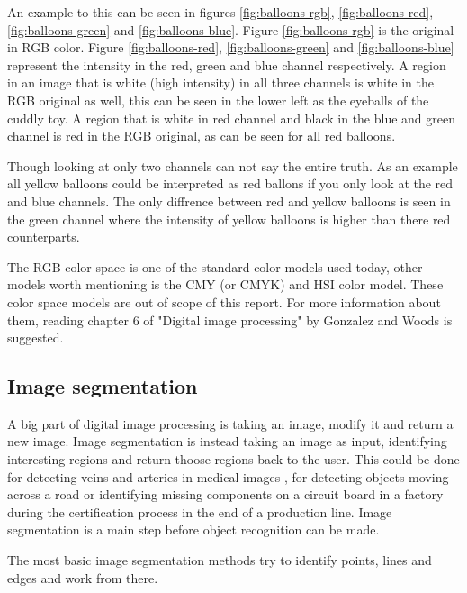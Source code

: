 An example to this can be seen in figures \ref{fig:balloons-rgb},
\ref{fig:balloons-red}, \ref{fig:balloons-green} and \ref{fig:balloons-blue}.
Figure \ref{fig:balloons-rgb} is the original in RGB color. Figure \ref{fig:balloons-red},
\ref{fig:balloons-green} and \ref{fig:balloons-blue} represent the intensity in the red,
green and blue channel respectively. A region in an image that is white (high
intensity) in all three channels is white in the RGB original as well, this can
be seen in the lower left as the eyeballs of the cuddly toy. A region that is white
in red channel and black in the blue and green channel is red in the RGB original, as
can be seen for all red balloons.

Though looking at only two channels can not say the entire truth. As an example all
yellow balloons could be interpreted as red ballons if you only look at the
red and blue channels. The only diffrence between red and yellow balloons is
seen in the green channel where the intensity of yellow balloons is higher than
there red counterparts.

The RGB color space is one of the standard color models used today, other models
worth mentioning is the CMY (or CMYK) and HSI color model. These color space
models are out of scope of this report. For more information about them,
reading chapter 6 of "Digital image processing" by Gonzalez and Woods \cite{gonzalez2008} is suggested.


\subsection{Image segmentation}
A big part of digital image processing is taking an image, modify it and
return a new image. Image segmentation is instead taking an image as input,
identifying interesting regions and return thoose regions back to the user.
This could be done for detecting veins and arteries in medical images \cite{olena2010},
for detecting objects moving across a road or identifying missing components on
a circuit board in a factory during the certification process in the end of a production line.
Image segmentation is a main step before object recognition can be made.

The most basic image segmentation methods try to identify points, lines and edges
and work from there.

